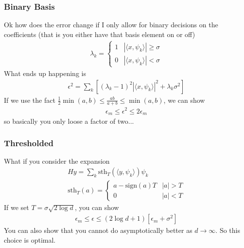 \subsubsection{Binary Basis}
Ok how does the error change if I only allow for binary decisions on the coefficients (that is you either have that basis element on or off)
\begin{align}
	\lambda_k = \begin{cases}
		1 & |\langle x, \psi_k \rangle| \geq \sigma\\
		0 & |\langle x, \psi_k \rangle| < \sigma
	\end{cases}
\end{align}
What ends up happening is
\begin{align}
	\epsilon^2 = \sum_k [(\lambda_k - 1)^2 |\langle x, \psi_k \rangle|^2 + \lambda_k \sigma^2]
\end{align}
If we use the fact $\frac{1}{2}\min(a,b) \leq \frac{ab}{a+b} \leq \min(a,b)$, we can show 
\begin{align}
	\epsilon_m \leq \epsilon^2 \leq 2 \epsilon_m
\end{align}
so basically you only loose a factor of two...

\subsubsection{Thresholded}
What if you consider the expansion
\begin{align}
	Hy = \sum_k \text{sth}_T(\langle y, \psi_k \rangle ) \psi_k\\
	\text{sth}_T(a) = \begin{cases}
		a - \text{sign}(a) T & |a| > T\\
		0 & |a|< T
	\end{cases}
\end{align}
If we set $T = \sigma \sqrt{2 \log d}$, you can show
\begin{align}
	\epsilon_m \leq \epsilon \leq (2 \log d +1) [\epsilon_m + \sigma^2]
\end{align} 
You can also show that you cannot do asymptotically better as $d \to \infty$. So this choice is optimal.

